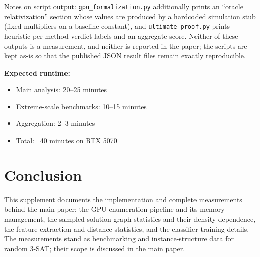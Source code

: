 \documentclass[11pt]{article}
\newcommand{\SAT}{\textsf{SAT}}
\begin{document}
Notes on script output: \texttt{gpu\_formalization.py} additionally prints an
``oracle relativization'' section whose values are produced by a hardcoded
simulation stub (fixed multipliers on a baseline constant), and
\texttt{ultimate\_proof.py} prints heuristic per-method verdict labels and an
aggregate score. Neither of these outputs is a measurement, and neither is
reported in the paper; the scripts are kept as-is so that the published JSON
result files remain exactly reproducible.

\textbf{Expected runtime:}
\begin{itemize}
\item Main analysis: 20--25 minutes
\item Extreme-scale benchmarks: 10--15 minutes
\item Aggregation: 2--3 minutes
\item Total: ~40 minutes on RTX 5070
\end{itemize}

\section{Conclusion}

This supplement documents the implementation and complete measurements behind
the main paper: the GPU enumeration pipeline and its memory management, the
sampled solution-graph statistics and their density dependence, the feature
extraction and distance statistics, and the classifier training details. The
measurements stand as benchmarking and instance-structure data for random
3-\SAT{}; their scope is discussed in the main paper.
\end{document}
